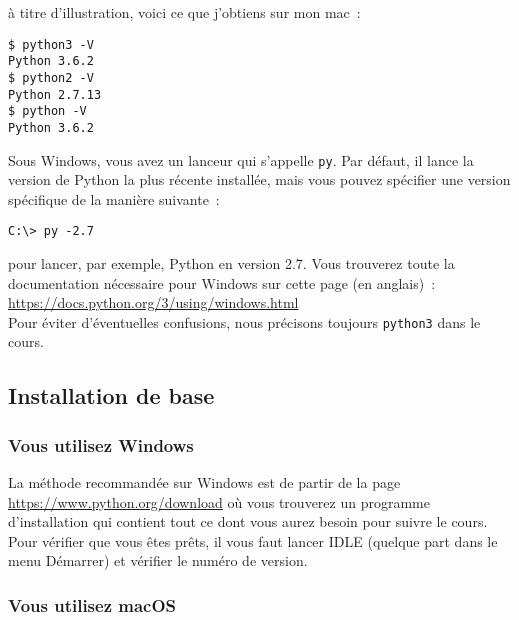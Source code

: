 à titre d'illustration, voici ce que j'obtiens sur mon mac~:

\begin{verbatim}
$ python3 -V
Python 3.6.2
$ python2 -V
Python 2.7.13
$ python -V
Python 3.6.2
\end{verbatim}

Sous Windows, vous avez un lanceur qui s'appelle \texttt{py}. Par
défaut, il lance la version de Python la plus récente installée, mais
vous pouvez spécifier une version spécifique de la manière suivante~:

\begin{verbatim}
C:\> py -2.7
\end{verbatim}

pour lancer, par exemple, Python en version 2.7. Vous trouverez toute la
documentation nécessaire pour Windows sur cette page (en anglais)~:
\href{https://docs.python.org/3/using/windows.html}{https://docs.python.org/3/using/windows.html}\\

Pour éviter d'éventuelles confusions, nous précisons toujours
\texttt{python3} dans le cours.

    \hypertarget{installation-de-base}{%
\subsection{Installation de base}\label{installation-de-base}}

    \hypertarget{vous-utilisez-windows}{%
\subsubsection{Vous utilisez Windows}\label{vous-utilisez-windows}}

    La méthode recommandée sur Windows est de partir de la page
\href{https://www.python.org/download}{https://www.python.org/download} où vous trouverez un programme
d'installation qui contient tout ce dont vous aurez besoin pour suivre
le cours.\\

Pour vérifier que vous êtes prêts, il vous faut lancer IDLE (quelque
part dans le menu Démarrer) et vérifier le numéro de version.

    \hypertarget{vous-utilisez-macos}{%
\subsubsection{Vous utilisez macOS}\label{vous-utilisez-macos}}

